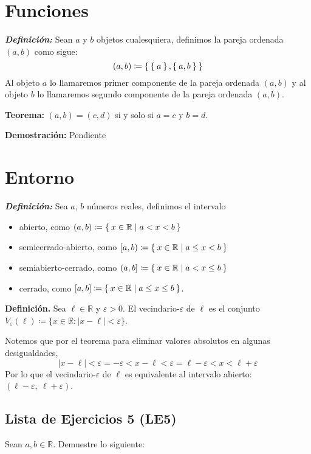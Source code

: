 \documentclass[11pt]{article}
\newcommand{\R}{\mathbb{R}}
\newcommand{\defined}{\coloneqq}
\newcommand{\bfit}[1]{\textbf{\textit{#1}}}
\let\epsilon\varepsilon
\let\set\Set
\begin{document}
\section*{Funciones}

\bfit{Definición:}  Sean $a$ y $b$ objetos cualesquiera, definimos la pareja ordenada $(a,b)$ como sigue: \[
 (a,b)\coloneqq \set{\set{a}, \set{a,b}}\]
Al objeto $a$ lo llamaremos primer componente de la pareja ordenada $(a,b)$ y al objeto $b$ lo llamaremos segundo componente de la pareja ordenada $(a,b)$.

\textbf{Teorema:} $(a,b)=(c,d)$ si y solo si $a=c$ y $b=d$.

\textbf{Demostración:} Pendiente



\section*{Entorno}

\bfit{Definición:}  Sea $a$, $b$ números reales, definimos el intervalo \begin{itemize}
 \item abierto, como $(a,b)\defined \set{x\in \R| a<x<b}$
 \item semicerrado-abierto, como $[a,b)\defined \set{x\in \R|a\leq x <b}$
 \item semiabierto-cerrado, como $(a,b]\defined \set{x\in \R|a<x\leq b}$
 \item cerrado, como $[a,b]\defined \set{x\in \R|a\leq x\leq b}$.
\end{itemize}

\textbf{Definición.} Sea $\ell \in \R$ y $\varepsilon>0$. El vecindario-$\varepsilon$ de $\ell$ es el conjunto $V_\varepsilon(\ell)\defined \{ x\in \R: |x-\ell|<\varepsilon\}$.

Notemos que por el teorema para eliminar valores absolutos en algunas desigualdades, \[|x-\ell| < \epsilon= -\epsilon < x-\ell < \epsilon= \ell-\epsilon < x < \ell+\epsilon\]
Por lo que el vecindario-$\epsilon$ de $\ell$ es equivalente al intervalo abierto: $(\ell-\epsilon, \ \ell+\epsilon)$.

\subsection*{Lista de Ejercicios 5 (LE5)}

Sean $a,b \in \R$. Demuestre lo siguiente:
\end{document}
